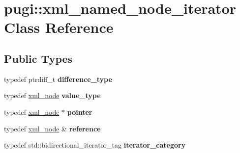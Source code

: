 \hypertarget{classpugi_1_1xml__named__node__iterator}{}\section{pugi\+:\+:xml\+\_\+named\+\_\+node\+\_\+iterator Class Reference}
\label{classpugi_1_1xml__named__node__iterator}
\subsection*{Public Types}
\begin{DoxyCompactItemize}
\item 
\hypertarget{classpugi_1_1xml__named__node__iterator_a18fa0d610fea4d64271729abc0e28849}{}typedef ptrdiff\+\_\+t {\bfseries difference\+\_\+type}\label{classpugi_1_1xml__named__node__iterator_a18fa0d610fea4d64271729abc0e28849}

\item 
\hypertarget{classpugi_1_1xml__named__node__iterator_a8d98d8218ea9740ceb990ef2c1a456e2}{}typedef \hyperlink{classpugi_1_1xml__node}{xml\+\_\+node} {\bfseries value\+\_\+type}\label{classpugi_1_1xml__named__node__iterator_a8d98d8218ea9740ceb990ef2c1a456e2}

\item 
\hypertarget{classpugi_1_1xml__named__node__iterator_aebf72c68ded20cf483a10c6b94aa3f57}{}typedef \hyperlink{classpugi_1_1xml__node}{xml\+\_\+node} $\ast$ {\bfseries pointer}\label{classpugi_1_1xml__named__node__iterator_aebf72c68ded20cf483a10c6b94aa3f57}

\item 
\hypertarget{classpugi_1_1xml__named__node__iterator_a1c338c7a2aefe04b83f746a963df808b}{}typedef \hyperlink{classpugi_1_1xml__node}{xml\+\_\+node} \& {\bfseries reference}\label{classpugi_1_1xml__named__node__iterator_a1c338c7a2aefe04b83f746a963df808b}

\item 
\hypertarget{classpugi_1_1xml__named__node__iterator_ab7dad0df34f043a9458b2a6b309a227f}{}typedef std\+::bidirectional\+\_\+iterator\+\_\+tag {\bfseries iterator\+\_\+category}\label{classpugi_1_1xml__named__node__iterator_ab7dad0df34f043a9458b2a6b309a227f}

\end{DoxyCompactItemize}
